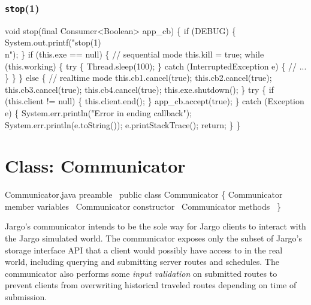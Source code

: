 \subsection{\texttt{stop}(1)}
\nwenddocs{}\endmoddef{}
void stop(final Consumer<Boolean> app_cb) \{
  if (DEBUG) \{
    System.out.printf("stop(1)\\n");
  \}
  if (this.exe == null) \{  // sequential mode
    this.kill = true;
    while (this.working) \{
      try \{
        Thread.sleep(100);
      \} catch (InterruptedException e) \{
        // ...
      \}
    \}
  \} else \{  // realtime mode
    this.cb1.cancel(true);
    this.cb2.cancel(true);
    this.cb3.cancel(true);
    this.cb4.cancel(true);
    this.exe.shutdown();
  \}
  try \{
    if (this.client != null) \{
      this.client.end();
    \}
    app_cb.accept(true);
  \} catch (Exception e) \{
    System.err.println("Error in ending callback");
    System.err.println(e.toString());
    e.printStackTrace();
    return;
  \}
\}
\eatline
{}\nwendcode{}\nwdocspar
\nwenddocs{}\chapter{Class: Communicator}
\label{communicator}

\nwenddocs{}\endmoddef{}
\LA{}Communicator.java preamble~{\nwtagstyle{}}\RA{}
public class Communicator \{
  \LA{}\code{}Communicator\edoc{} member variables~{\nwtagstyle{}}\RA{}
  \LA{}\code{}Communicator\edoc{} constructor~{\nwtagstyle{}}\RA{}
  \LA{}\code{}Communicator\edoc{} methods~{\nwtagstyle{}}\RA{}
\}
\nwendcode{}\nwdocspar

Jargo's communicator intends to be the sole way for Jargo clients to interact
with the Jargo simulated world. The communicator exposes only the subset of
Jargo's storage interface API that a client would possibly have access to in
the real world, including querying and submitting server routes and schedules.
The communicator also performs some \emph{input validation} on submitted routes
to prevent clients from overwriting historical traveled routes depending on
time of submission.

